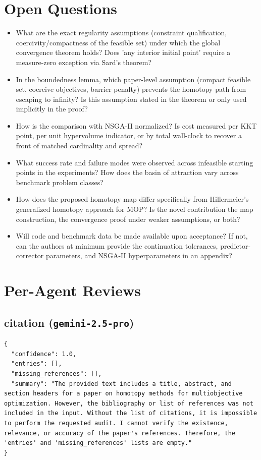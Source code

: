 \documentclass[11pt]{article}
\begin{document}
\section*{Open Questions}
\begin{itemize}[leftmargin=*]
  \item What are the exact regularity assumptions (constraint qualification, coercivity/compactness of the feasible set) under which the global convergence theorem holds? Does 'any interior initial point' require a measure-zero exception via Sard's theorem?
  \item In the boundedness lemma, which paper-level assumption (compact feasible set, coercive objectives, barrier penalty) prevents the homotopy path from escaping to infinity? Is this assumption stated in the theorem or only used implicitly in the proof?
  \item How is the comparison with NSGA-II normalized? Is cost measured per KKT point, per unit hypervolume indicator, or by total wall-clock to recover a front of matched cardinality and spread?
  \item What success rate and failure modes were observed across infeasible starting points in the experiments? How does the basin of attraction vary across benchmark problem classes?
  \item How does the proposed homotopy map differ specifically from Hillermeier's generalized homotopy approach for MOP? Is the novel contribution the map construction, the convergence proof under weaker assumptions, or both?
  \item Will code and benchmark data be made available upon acceptance? If not, can the authors at minimum provide the continuation tolerances, predictor-corrector parameters, and NSGA-II hyperparameters in an appendix?
\end{itemize}

\section*{Per-Agent Reviews}
\subsection*{citation (\texttt{gemini-2.5-pro})}
\begin{verbatim}
{
  "confidence": 1.0,
  "entries": [],
  "missing_references": [],
  "summary": "The provided text includes a title, abstract, and section headers for a paper on homotopy methods for multiobjective optimization. However, the bibliography or list of references was not included in the input. Without the list of citations, it is impossible to perform the requested audit. I cannot verify the existence, relevance, or accuracy of the paper's references. Therefore, the 'entries' and 'missing_references' lists are empty."
}
\end{verbatim}
\end{document}
